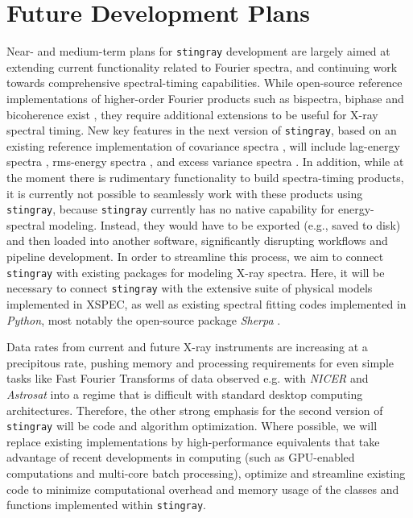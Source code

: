 \documentclass[twocolumn]{aastex62}
\newcommand{\stingray}{\texttt{stingray}\xspace}
\begin{document}

\section{Future Development Plans}
\label{sec:future}

Near- and medium-term plans for \stingray development are largely aimed at extending current functionality related to Fourier spectra, and continuing work towards comprehensive spectral-timing capabilities. 
While open-source reference implementations of higher-order Fourier products such as bispectra, biphase and bicoherence exist \citep{maccarone2002,maccarone2005,maccarone2013}, they require additional extensions to be useful for X-ray spectral timing. 
New key features in the next version of \stingray, based on an existing reference implementation of covariance spectra \citep{WilkinsonUttley09}, will include lag-energy spectra \citep{Vaughanetal94}, rms-energy spectra \citep{Revnivtsevetal99}, and excess variance spectra \citep{Vaughanetal03}. 
In addition, while at the moment there is rudimentary functionality to build spectra-timing products, it is currently not possible to seamlessly work with these products using \stingray, because \stingray currently has no native capability for energy-spectral modeling. 
Instead, they would have to be exported (e.g., saved to disk) and then loaded into another software, significantly disrupting workflows and pipeline development. 
In order to streamline this process, we aim to connect \stingray with existing packages for modeling X-ray spectra. 
Here, it will be necessary to connect \stingray with the extensive suite of physical models implemented in XSPEC, as well as existing spectral fitting codes implemented in \textit{Python}, most notably the open-source package \textit{Sherpa} \citep{sherpa}.

Data rates from current and future X-ray instruments are increasing at a precipitous rate, pushing memory and processing requirements for even simple tasks like Fast Fourier Transforms of data observed e.g. with \textit{NICER} and \textit{Astrosat} into a regime that is difficult with standard desktop computing architectures. 
Therefore, the other strong emphasis for the second version of \stingray will be code and algorithm optimization. 
Where possible, we will replace existing implementations by high-performance equivalents that take advantage of recent developments in computing (such as GPU-enabled computations and multi-core batch processing), optimize and streamline existing code to minimize computational overhead and memory usage of the classes and functions implemented within \stingray. 
\end{document}
